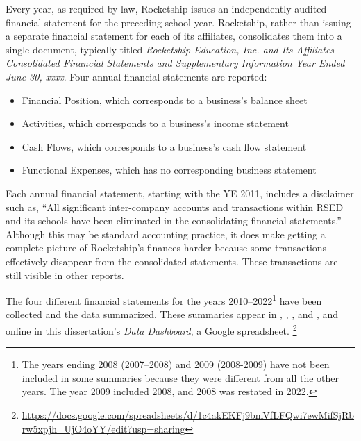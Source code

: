 Every year, as required by law, Rocketship issues an independently audited financial statement for the preceding school year. Rocketship, rather than issuing a separate financial statement for each of its affiliates, consolidates them into a single document, typically titled \emph{Rocketship Education, Inc. and Its Affiliates Consolidated Financial Statements and Supplementary Information Year Ended June 30, xxxx}. Four annual financial statements are reported:

\begin{itemize}
  \item Financial Position, which corresponds to a business's balance sheet\\
  \item Activities, which corresponds to a business's income statement\\
  \item Cash Flows, which corresponds to a business's cash flow statement\\
  \item Functional Expenses, which has no corresponding business statement\\
\end{itemize}

Each annual financial statement, starting with the YE 2011, includes a disclaimer such as, ``All significant inter-company accounts and transactions within RSED and its schools have been eliminated in the consolidating financial statements.'' Although this may be standard accounting practice, it does make getting a complete picture of Rocketship's finances harder because some transactions effectively disappear from the consolidated statements. These transactions are still visible in other reports.

The four different financial statements for the years 2010–2022\footnote{The years ending 2008 (2007–2008) and 2009 (2008-2009) have not been included in some summaries because they were different from all the other years. The year 2009 included 2008, and 2008 was restated in 2022.} have been collected and the data summarized. These summaries appear in , , , and , and online in this dissertation's \textit{Data Dashboard}, a Google spreadsheet.%
\footnote{\url{https://docs.google.com/spreadsheets/d/1c4akEKFj9bmVfLFQwi7ewMifSjRbrw5xpjh_UjO4oYY/edit?usp=sharing}}

